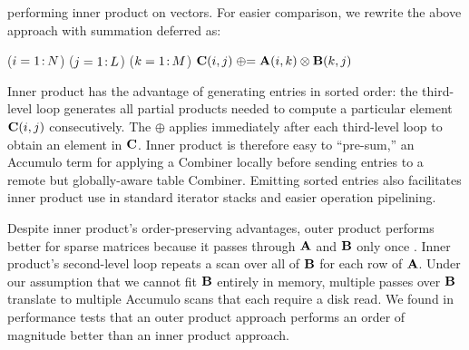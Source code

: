 \noindent %
performing inner product on vectors.
For easier comparison, we rewrite the above approach with summation deferred as:

\removelatexerror
\begin{algorithm}[H]
\vspace{\algspace}
\fore($i = 1\colon\! N$){
\fore($j = 1\colon\! L$){
\fore($k = 1\colon\! M$){
{$\mathbf{C}(i,j) \mathrel{\oplus}= \mathbf{A}(i,k) \otimes \mathbf{B}(k,j)$}
}}}
\vspace{\algspace}
\end{algorithm}

Inner product has the advantage of generating entries in sorted order:
the third-level loop generates all partial products needed 
to compute a particular element $\mathbf{C}(i,j)$ consecutively.
The $\oplus$ applies immediately after each third-level loop to obtain an element in $\mathbf{C}$.
Inner product is therefore easy to ``pre-sum,'' an Accumulo term for applying a Combiner
locally before sending entries to a remote but globally-aware table Combiner.
Emitting sorted entries also facilitates inner product use in standard iterator stacks and easier operation pipelining.

Despite inner product's order-preserving advantages, 
outer product performs better for sparse matrices 
because it passes through $\mathbf{A}$ and $\mathbf{B}$ only once 
\cite{burkhardt2013big}\cite{burkhardt2014asking}.  
Inner product's second-level loop repeats
a scan over all of $\mathbf{B}$ for each row of $\mathbf{A}$.
Under our assumption that we cannot fit $\mathbf{B}$ entirely in memory,
multiple passes over $\mathbf{B}$ translate to multiple Accumulo scans that each require a disk read.
We found in performance tests that an outer product approach performs an order of magnitude better than an inner product approach.

